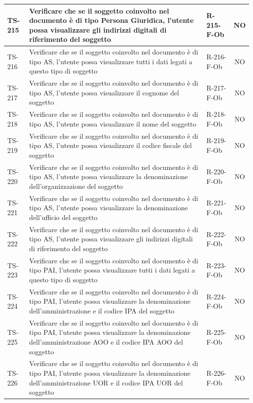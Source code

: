 \documentclass[a4paper,12pt]{article}
\begin{document}
\begin{longtable}{|p{1.5cm}|p{8.3cm}|p{2.4cm}|c|}
\hline
TS-215 & Verificare che se il soggetto coinvolto nel documento è di tipo Persona Giuridica, l'utente possa visualizzare gli indirizzi digitali di riferimento del soggetto & R-215-F-Ob & NO \\
\hline
TS-216 & Verificare che se il soggetto coinvolto nel documento è di tipo AS, l'utente possa visualizzare tutti i dati legati a questo tipo di soggetto & R-216-F-Ob & NO \\
\hline
TS-217 & Verificare che se il soggetto coinvolto nel documento è di tipo AS, l'utente possa visualizzare il cognome del soggetto & R-217-F-Ob & NO \\
\hline
TS-218 & Verificare che se il soggetto coinvolto nel documento è di tipo AS, l'utente possa visualizzare il nome del soggetto & R-218-F-Ob & NO \\
\hline
TS-219 & Verificare che se il soggetto coinvolto nel documento è di tipo AS, l'utente possa visualizzare il codice fiscale del soggetto & R-219-F-Ob & NO \\
\hline
TS-220 & Verificare che se il soggetto coinvolto nel documento è di tipo AS, l'utente possa visualizzare la denominazione dell'organizzazione del soggetto & R-220-F-Ob & NO \\
\hline
TS-221 & Verificare che se il soggetto coinvolto nel documento è di tipo AS, l'utente possa visualizzare la denominazione dell'ufficio del soggetto & R-221-F-Ob & NO \\
\hline
TS-222 & Verificare che se il soggetto coinvolto nel documento è di tipo AS, l'utente possa visualizzare gli indirizzi digitali di riferimento del soggetto & R-222-F-Ob & NO \\
\hline
TS-223 & Verificare che se il soggetto coinvolto nel documento è di tipo PAI, l'utente possa visualizzare tutti i dati legati a questo tipo di soggetto & R-223-F-Ob & NO \\
\hline
TS-224 & Verificare che se il soggetto coinvolto nel documento è di tipo PAI, l'utente possa visualizzare la denominazione dell'amministrazione e il codice IPA del soggetto & R-224-F-Ob & NO \\
\hline
TS-225 & Verificare che se il soggetto coinvolto nel documento è di tipo PAI, l'utente possa visualizzare la denominazione dell'amministrazione AOO e il codice IPA AOO del soggetto & R-225-F-Ob & NO \\
\hline
TS-226 & Verificare che se il soggetto coinvolto nel documento è di tipo PAI, l'utente possa visualizzare la denominazione dell'amministrazione UOR e il codice IPA UOR del soggetto & R-226-F-Ob & NO \\

\end{longtable}
\end{document}
